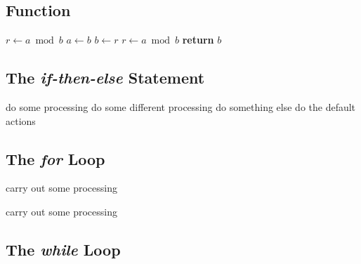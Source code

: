 \documentclass{amsart}
\begin{document}
\subsection{Function}

\begin{algorithmic}[1]
    \State $r\gets a\bmod b$
        \State $a\gets b$
        \State $b\gets r$
        \State $r\gets a\bmod b$
    \EndWhile
    \State \textbf{return} $b$%
\EndFunction
\end{algorithmic}

\subsection{The \emph{if-then-else} Statement}


\begin{algorithmic}[1]
        \State do some processing
        \State do some different processing
        \State do something else
    \Else{}
        \State do the default actions
    \EndIf
\end{algorithmic}

\subsection{The \emph{for} Loop}

\begin{algorithmic}[1]
        \State carry out some processing 
    \EndFor
\end{algorithmic}

\begin{algorithmic}[1]
        \State carry out some processing 
    \EndFor
\end{algorithmic}


\subsection{The \emph{while} Loop}
\end{document}
